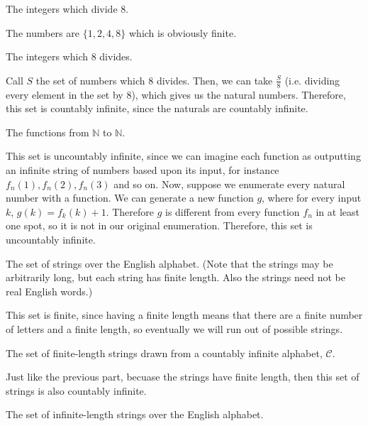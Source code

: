 \documentclass[11pt]{article}
\begin{document}
\begin{Parts}

\Part The integers which divide $8$.

\begin{solution}
  The numbers are $\{1, 2, 4, 8\}$ which is obviously finite.
\end{solution}

\Part The integers which $8$ divides.

\begin{solution}
  Call $S$ the set of numbers which 8 divides. Then, we can take $\frac{S}{8}$ (i.e. dividing every element in the set by 8), which gives us the natural numbers. Therefore, this set is countably infinite, since the naturals are countably infinite.
\end{solution}

\Part The functions from $\mathbb{N}$ to $\mathbb{N}$.

\begin{solution}
  This set is uncountably infinite, since we can imagine each function as outputting an infinite string of numbers based upon its input, for instance $f_n(1), f_n(2), f_n(3)$ and so on. Now, suppose we enumerate every natural number with a function. We can generate a new function $g$, where for every input $k$, $g(k) = f_k(k) + 1$. Therefore $g$ is different from every function $f_n$ in at least one spot, so it is not in our original enumeration. Therefore, this set is uncountably infinite.
\end{solution}

\Part The set of strings over the English alphabet. (Note that the strings may be arbitrarily long, but each string has finite length. Also the strings need not be real English words.)

\begin{solution}
  This set is finite, since having a finite length means that there are a finite number of letters and a finite length, so eventually we will run out of possible strings.  
\end{solution}

\Part The set of finite-length strings drawn from a countably infinite alphabet, $\mathcal{C}$.

\begin{solution}
  Just like the previous part, becuase the strings have finite length, then this set of strings is also countably infinite.
\end{solution}

\Part The set of infinite-length strings over the English alphabet.


\end{Parts}
\end{document}
